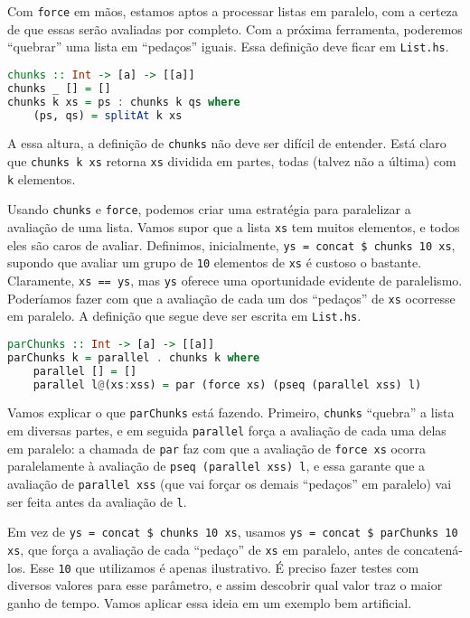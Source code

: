 \documentclass[a4paper]{article}
\begin{document}
Com \texttt{force} em mãos, estamos aptos a processar listas em paralelo, com a certeza de que essas serão avaliadas por completo.
Com a próxima ferramenta, poderemos ``quebrar'' uma lista em ``pedaços'' iguais.
Essa definição deve ficar em \texttt{List.hs}.

\begin{lstlisting}[language=haskell, frame=single]
chunks :: Int -> [a] -> [[a]]
chunks _ [] = []
chunks k xs = ps : chunks k qs where
    (ps, qs) = splitAt k xs
\end{lstlisting}

A essa altura, a definição de \texttt{chunks} não deve ser difícil de entender.
Está claro que \mbox{\texttt{chunks k xs}} retorna \texttt{xs} dividida em partes, todas (talvez não a última) com \texttt{k} elementos.

Usando \texttt{chunks} e \texttt{force}, podemos criar uma estratégia para paralelizar a avaliação de uma lista.
Vamos supor que a lista \texttt{xs} tem muitos elementos, e todos eles são caros de avaliar.
Definimos, inicialmente, \texttt{ys = concat \$ chunks 10 xs}, supondo que avaliar um grupo de \texttt{10} elementos de \texttt{xs} é custoso o bastante.
Claramente, \texttt{xs == ys}, mas \texttt{ys} oferece uma oportunidade evidente de paralelismo.
Poderíamos fazer com que a avaliação de cada um dos ``pedaços'' de \texttt{xs} ocorresse em paralelo.
A definição que segue deve ser escrita em \texttt{List.hs}.

\begin{lstlisting}[language=haskell, frame=single]
parChunks :: Int -> [a] -> [[a]]
parChunks k = parallel . chunks k where
    parallel [] = []
    parallel l@(xs:xss) = par (force xs) (pseq (parallel xss) l)
\end{lstlisting}

Vamos explicar o que \texttt{parChunks} está fazendo.
Primeiro, \texttt{chunks} ``quebra'' a lista em diversas partes, e em seguida \texttt{parallel} força a avaliação de cada uma delas em paralelo: a chamada de \texttt{par} faz com que a avaliação de \mbox{\texttt{force xs}} ocorra paralelamente à avaliação de \texttt{pseq (parallel xss) l}, e essa garante que a avaliação de \texttt{parallel xss} (que vai forçar os demais ``pedaços'' em paralelo) vai ser feita antes da avaliação de \texttt{l}.

Em vez de \texttt{ys = concat \$ chunks 10 xs}, usamos \mbox{\texttt{ys = concat \$ parChunks 10 xs}}, que força a avaliação de cada ``pedaço'' de \texttt{xs} em paralelo, antes de concatená-los.
Esse \texttt{10} que utilizamos é apenas ilustrativo.
É preciso fazer testes com diversos valores para esse parâmetro, e assim descobrir qual valor traz o maior ganho de tempo.
Vamos aplicar essa ideia em um exemplo bem artificial.
\end{document}
